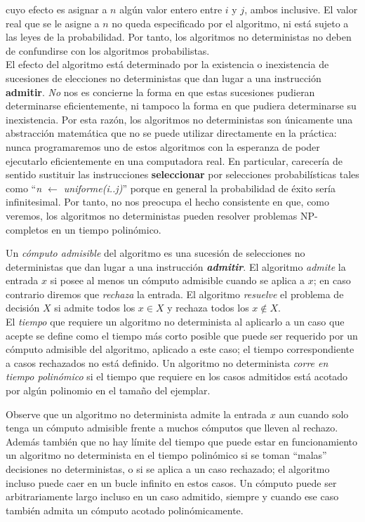 cuyo efecto es asignar a $n$ algún valor entero entre $i$ y $j$, ambos inclusive. El valor real que se le asigne a $n$ no queda especificado por el algoritmo, ni está sujeto a las leyes de la probabilidad. Por tanto, los algoritmos no deterministas no deben de confundirse con los algoritmos probabilistas.\\

El efecto del algoritmo está determinado por la existencia o inexistencia de sucesiones de elecciones no deterministas que dan lugar a una instrucción \textbf{admitir}. \emph{No} nos es concierne la forma en que estas sucesiones pudieran determinarse eficientemente, ni tampoco la forma en que pudiera determinarse su inexistencia. Por esta razón, los algoritmos no deterministas son únicamente una abstracción matemática que no se puede utilizar directamente en la práctica: nunca programaremos uno de estos algoritmos con la esperanza de poder ejecutarlo eficientemente en una computadora real. En particular, carecería de sentido sustituir las instrucciones \textbf{seleccionar} por selecciones probabilísticas tales como ``\emph{n $\leftarrow$ uniforme(i..j)}'' porque en general la probabilidad de éxito sería infinitesimal. Por tanto, no nos preocupa el hecho consistente en que, como veremos, los algoritmos no deterministas pueden resolver problemas NP-completos en un tiempo polinómico.

\begin{fondo}
Un \emph{cómputo admisible} del algoritmo es una sucesión de selecciones no deterministas que dan lugar a  una instrucción \emph{\textbf{admitir}}. El algoritmo \emph{admite} la entrada $x$ si posee al menos un cómputo admisible cuando se aplica a $x$; en caso contrario diremos que \emph{rechaza} la entrada. El algoritmo \emph{resuelve} el problema de decisión $X$ si admite todos los $x \in X$ y rechaza todos los $x \notin X$.\\
El \emph{tiempo} que requiere un algoritmo no determinista al aplicarlo a un caso que acepte se define como el tiempo más corto posible que puede ser requerido por un cómputo admisible del algoritmo, aplicado a este caso; el tiempo correspondiente a casos rechazados no está definido. Un algoritmo no determinista \emph{corre en tiempo polinómico} si el tiempo que requiere en los casos admitidos está acotado por algún polinomio en el tamaño del ejemplar.\\
\end{fondo}

Observe que un algoritmo no determinista admite la entrada $x$ aun cuando solo tenga un cómputo admisible frente a muchos cómputos que lleven al rechazo. Además también que no hay límite del tiempo que puede estar en funcionamiento un algoritmo no determinista en el tiempo polinómico si se toman ``malas'' decisiones no deterministas, o si se aplica a un caso rechazado; el algoritmo incluso puede caer en un bucle infinito en estos casos. Un cómputo puede ser arbitrariamente largo incluso en un caso admitido, siempre y cuando ese caso también admita un cómputo acotado polinómicamente.\\

